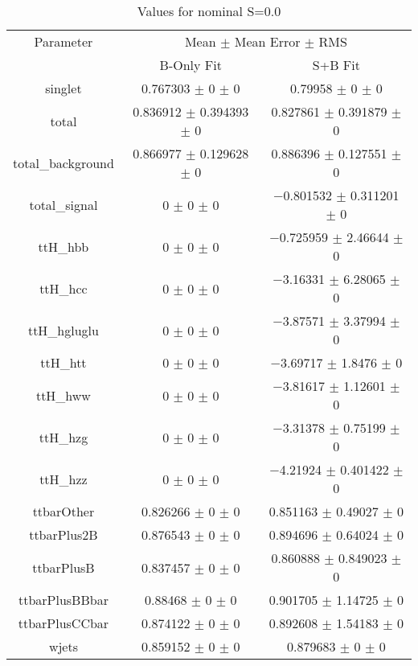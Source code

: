 \begin{table}
\centering
\caption{Values for nominal S=0.0}
\begin{tabular}{ccc}
\toprule
Parameter & \multicolumn{2}{c}{Mean $\pm$ Mean Error $\pm$ RMS}\\
 & B-Only Fit & S+B Fit\\
\midrule
singlet & \num{0.767303} $\pm$ \num{0} $\pm$ \num{0} & \num{0.79958} $\pm$ \num{0} $\pm$ \num{0}\\
total & \num{0.836912} $\pm$ \num{0.394393} $\pm$ \num{0} & \num{0.827861} $\pm$ \num{0.391879} $\pm$ \num{0}\\
total\_background & \num{0.866977} $\pm$ \num{0.129628} $\pm$ \num{0} & \num{0.886396} $\pm$ \num{0.127551} $\pm$ \num{0}\\
total\_signal & \num{0} $\pm$ \num{0} $\pm$ \num{0} & \num{-0.801532} $\pm$ \num{0.311201} $\pm$ \num{0}\\
ttH\_hbb & \num{0} $\pm$ \num{0} $\pm$ \num{0} & \num{-0.725959} $\pm$ \num{2.46644} $\pm$ \num{0}\\
ttH\_hcc & \num{0} $\pm$ \num{0} $\pm$ \num{0} & \num{-3.16331} $\pm$ \num{6.28065} $\pm$ \num{0}\\
ttH\_hgluglu & \num{0} $\pm$ \num{0} $\pm$ \num{0} & \num{-3.87571} $\pm$ \num{3.37994} $\pm$ \num{0}\\
ttH\_htt & \num{0} $\pm$ \num{0} $\pm$ \num{0} & \num{-3.69717} $\pm$ \num{1.8476} $\pm$ \num{0}\\
ttH\_hww & \num{0} $\pm$ \num{0} $\pm$ \num{0} & \num{-3.81617} $\pm$ \num{1.12601} $\pm$ \num{0}\\
ttH\_hzg & \num{0} $\pm$ \num{0} $\pm$ \num{0} & \num{-3.31378} $\pm$ \num{0.75199} $\pm$ \num{0}\\
ttH\_hzz & \num{0} $\pm$ \num{0} $\pm$ \num{0} & \num{-4.21924} $\pm$ \num{0.401422} $\pm$ \num{0}\\
ttbarOther & \num{0.826266} $\pm$ \num{0} $\pm$ \num{0} & \num{0.851163} $\pm$ \num{0.49027} $\pm$ \num{0}\\
ttbarPlus2B & \num{0.876543} $\pm$ \num{0} $\pm$ \num{0} & \num{0.894696} $\pm$ \num{0.64024} $\pm$ \num{0}\\
ttbarPlusB & \num{0.837457} $\pm$ \num{0} $\pm$ \num{0} & \num{0.860888} $\pm$ \num{0.849023} $\pm$ \num{0}\\
ttbarPlusBBbar & \num{0.88468} $\pm$ \num{0} $\pm$ \num{0} & \num{0.901705} $\pm$ \num{1.14725} $\pm$ \num{0}\\
ttbarPlusCCbar & \num{0.874122} $\pm$ \num{0} $\pm$ \num{0} & \num{0.892608} $\pm$ \num{1.54183} $\pm$ \num{0}\\
wjets & \num{0.859152} $\pm$ \num{0} $\pm$ \num{0} & \num{0.879683} $\pm$ \num{0} $\pm$ \num{0}\\
\bottomrule
\end{tabular}
\end{table}